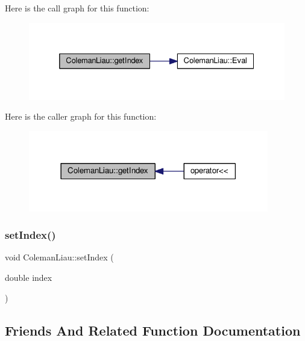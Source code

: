 Here is the call graph for this function\+:
\nopagebreak
\begin{figure}[H]
\begin{center}
\leavevmode
\includegraphics[width=332pt]{class_coleman_liau_a3a9e5cb64586313a753211c350147cb3_cgraph}
\end{center}
\end{figure}
Here is the caller graph for this function\+:
\nopagebreak
\begin{figure}[H]
\begin{center}
\leavevmode
\includegraphics[width=297pt]{class_coleman_liau_a3a9e5cb64586313a753211c350147cb3_icgraph}
\end{center}
\end{figure}
\mbox{\label{class_coleman_liau_a077d1533dfd8145ed729531c6edbfad0}} 
\subsubsection{\texorpdfstring{set\+Index()}{setIndex()}}
{\footnotesize\ttfamily void Coleman\+Liau\+::set\+Index (\begin{DoxyParamCaption}\item[{double}]{index }\end{DoxyParamCaption})\hspace{0.3cm}{\ttfamily [inline]}}



\subsection{Friends And Related Function Documentation}
\mbox{\label{class_coleman_liau_a896867aacd954df4faecc74a7010a8b0}} 
